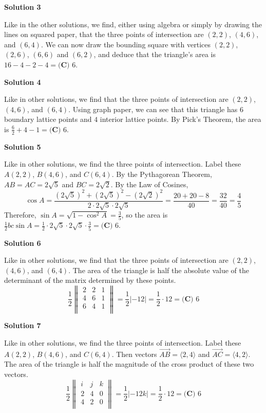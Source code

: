 \begin{enumerate}
 



\textbf{Solution 3}

Like in the other solutions, we find, either using algebra or simply by drawing the lines on squared paper, that the three points of intersection are $(2, 2)$, $(4, 6)$, and $(6, 4)$. We can now draw the bounding square with vertices $(2, 2)$, $(2, 6)$, $(6, 6)$ and $(6, 2)$, and deduce that the triangle's area is $16-4-2-4=\boxed{\textbf{(C) }6}$.

 



\textbf{Solution 4}

Like in other solutions, we find that the three points of intersection are  $(2, 2)$, $(4, 6)$, and $(6, 4)$. Using graph paper, we can see that this triangle has $6$ boundary lattice points and $4$ interior lattice points. By Pick's Theorem, the area is $\frac62 + 4 - 1 = \boxed{\textbf{(C) }6}$.

 



\textbf{Solution 5}

Like in other solutions, we find the three points of intersection. Label these $A (2, 2)$, $B (4, 6)$, and $C (6, 4)$. By the Pythagorean Theorem, $AB = AC = 2\sqrt5$ and $BC = 2\sqrt2$. By the Law of Cosines,
 \[\cos A = \frac{(2\sqrt5)^2 + (2\sqrt5)^2 - (2\sqrt2)^2}{2 \cdot 2\sqrt5 \cdot 2\sqrt5} = \frac{20 + 20 - 8}{40} = \frac{32}{40} = \frac45\]Therefore, $\sin A = \sqrt{1 - \cos^2 A} = \frac35$, so the area is $\frac12 bc \sin A = \frac12 \cdot 2\sqrt5 \cdot 2\sqrt5 \cdot \frac35 = \boxed{\textbf{(C) }6}$.

 



\textbf{Solution 6}

Like in other solutions, we find that the three points of intersection are  $(2, 2)$, $(4, 6)$, and $(6, 4)$. The area of the triangle is half the absolute value of the determinant of the matrix determined by these points.
 \[\frac12\begin{Vmatrix} 2&2&1\\ 4&6&1\\ 6&4&1\\ \end{Vmatrix} = \frac12|-12| = \frac12 \cdot 12 = \boxed{\textbf{(C) }6}\]




\textbf{Solution 7}

Like in other solutions, we find the three points of intersection. Label these $A (2, 2)$, $B (4, 6)$, and $C (6, 4)$. Then vectors $\overrightarrow{AB} = \langle 2, 4 \rangle$ and $\overrightarrow{AC} = \langle 4, 2 \rangle$. The area of the triangle is half the magnitude of the cross product of these two vectors.
 \[\frac12\begin{Vmatrix} i&j&k\\ 2&4&0\\ 4&2&0\\ \end{Vmatrix} = \frac12|-12k| = \frac12 \cdot 12 = \boxed{\textbf{(C) }6}\]





\end{enumerate}
